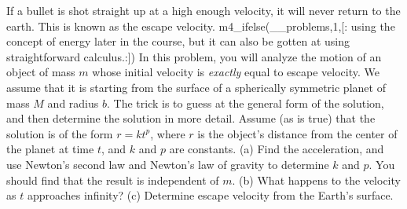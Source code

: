 If a bullet is shot straight up at a high enough
velocity, it will never return to the earth. This is known
as the escape velocity.
m4_ifelse(__problems,1,[:%
using the concept of energy later in the course,
but it can also be gotten at using straightforward calculus.:])
In this problem, you will analyze the motion of an object of
mass $m$ whose initial velocity is \emph{exactly} equal to
escape velocity. We assume that it is starting from the
surface of a spherically symmetric planet of mass $M$ and
radius $b$. The trick is to guess at the general form of the
solution, and then determine the solution in more detail.
Assume (as is true) that the solution is of the form 
$r= kt^p$, where $r$ is the object's distance from the center of
the planet at time $t$, and $k$ and $p$ are constants.\hwendpart
 (a)
Find the acceleration, and use Newton's second law and
Newton's law of gravity to determine $k$ and $p$. You should
find that the result is independent of $m$.\answercheck\hwendpart
 (b) What happens
to the velocity as $t$ approaches infinity?\hwendpart
 (c) Determine
escape velocity from the Earth's surface.\answercheck
